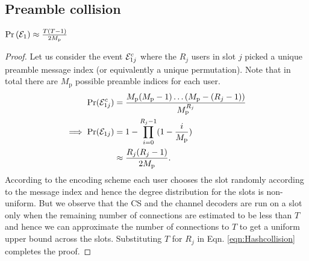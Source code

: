 \ifolder
\subsection{Preamble collision}
\begin{lemma}
$\mathrm{Pr} \left(\mathcal{E}_{1}\right)\approx \frac{T(T-1)}{2M_\mathrm{p}}$	
\label{lem:hashCollision}\\
\end{lemma}
\begin{proof}
Let us consider the event $\mathcal{E}_{1j}^c$ where the $R_j$ users in slot $j$ picked a unique preamble message index (or equivalently a unique permutation). Note that in total there are $M_\mathrm{p}$ possible preamble indices for each user.
\begin{align}
\mathrm{Pr}(\mathcal{E}_{1j}^c)&=\frac{M_\mathrm{p}(M_\mathrm{p}-1)\ldots(M_\mathrm{p}-(R_j-1))}{M_\mathrm{p}^{R_j}}\notag\\
\implies \mathrm{Pr}(\mathcal{E}_{1j})&=1-\prod_{i=0}^{R_j-1}(1-\frac{i}{M_\mathrm{p}})\notag\\
&\approx \frac{R_j(R_j-1)}{2M_\mathrm{p}}.\label{eqn:Hashcollision}
\end{align}
According to the encoding scheme each user chooses the slot randomly according to the message index and hence the degree distribution for the slots is non-uniform. But we observe that the CS and the channel decoders are run on a slot only when the remaining number of connections are estimated to be less than $T$ and hence we can approximate the number of connections to $T$ to get a uniform upper bound  across the slots. Substituting $T$ for $R_j$ in Eqn. \eqref{eqn:Hashcollision} completes the proof.
\end{proof}

